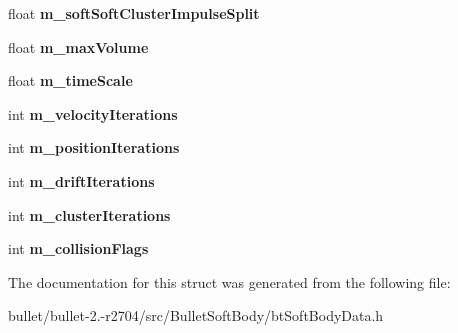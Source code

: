 \begin{DoxyCompactItemize}
\item 
\hypertarget{struct_soft_body_config_data_aaa8fd217fce1536fade851219c53e13a}{float {\bfseries m\+\_\+soft\+Soft\+Cluster\+Impulse\+Split}}\label{struct_soft_body_config_data_aaa8fd217fce1536fade851219c53e13a}

\item 
\hypertarget{struct_soft_body_config_data_a8f10820e57a836aa3f9afe96fb91dd83}{float {\bfseries m\+\_\+max\+Volume}}\label{struct_soft_body_config_data_a8f10820e57a836aa3f9afe96fb91dd83}

\item 
\hypertarget{struct_soft_body_config_data_a45179e535e69bffa509937203b8da3c9}{float {\bfseries m\+\_\+time\+Scale}}\label{struct_soft_body_config_data_a45179e535e69bffa509937203b8da3c9}

\item 
\hypertarget{struct_soft_body_config_data_a7f9f9401ad2c59a1810f643992176ccd}{int {\bfseries m\+\_\+velocity\+Iterations}}\label{struct_soft_body_config_data_a7f9f9401ad2c59a1810f643992176ccd}

\item 
\hypertarget{struct_soft_body_config_data_a7c3d650184de6591dc1295194ba2c07f}{int {\bfseries m\+\_\+position\+Iterations}}\label{struct_soft_body_config_data_a7c3d650184de6591dc1295194ba2c07f}

\item 
\hypertarget{struct_soft_body_config_data_a66565ccf03701e5c356b45c39c150bf6}{int {\bfseries m\+\_\+drift\+Iterations}}\label{struct_soft_body_config_data_a66565ccf03701e5c356b45c39c150bf6}

\item 
\hypertarget{struct_soft_body_config_data_af2f3d83fcf5758b451b85977926b5520}{int {\bfseries m\+\_\+cluster\+Iterations}}\label{struct_soft_body_config_data_af2f3d83fcf5758b451b85977926b5520}

\item 
\hypertarget{struct_soft_body_config_data_a0930b2bd4642ac6338df24033ffd62a3}{int {\bfseries m\+\_\+collision\+Flags}}\label{struct_soft_body_config_data_a0930b2bd4642ac6338df24033ffd62a3}

\end{DoxyCompactItemize}


The documentation for this struct was generated from the following file\+:\begin{DoxyCompactItemize}
\item 
bullet/bullet-\/2.-\/r2704/src/\+Bullet\+Soft\+Body/bt\+Soft\+Body\+Data.\+h\end{DoxyCompactItemize}
